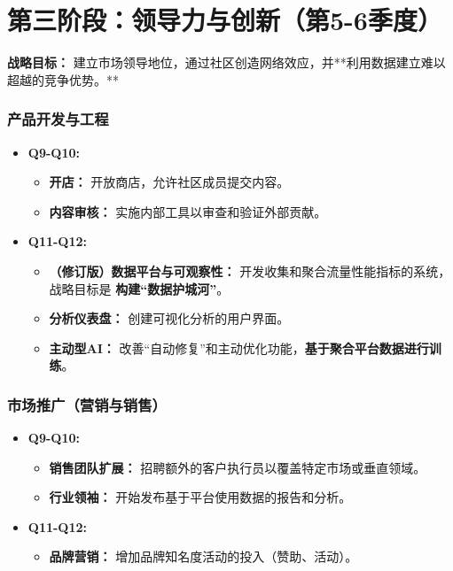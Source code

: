 \documentclass[11点, A4纸, 单面]{article}
\begin{document}
\clearpage

\section{第三阶段：领导力与创新（第5-6季度）}
\textbf{战略目标：} 建立市场领导地位，通过社区创造网络效应，并**利用数据建立难以超越的竞争优势。**

\subsubsection{产品开发与工程}
\begin{itemize}[leftmargin=*]
    \item \textbf{Q9-Q10:}
    \begin{itemize}
        \item \textbf{开店：} 开放商店，允许社区成员提交内容。
        \item \textbf{内容审核：} 实施内部工具以审查和验证外部贡献。
    \end{itemize}
    \item \textbf{Q11-Q12:}
    \begin{itemize}
        \item \textbf{（修订版）数据平台与可观察性：} 开发收集和聚合流量性能指标的系统，战略目标是 \textbf{构建“数据护城河”}。
        \item \textbf{分析仪表盘：} 创建可视化分析的用户界面。
        \item \textbf{主动型AI：} 改善“自动修复”和主动优化功能，\textbf{基于聚合平台数据进行训练}。
    \end{itemize}
\end{itemize}

\subsubsection{市场推广（营销与销售）}
\begin{itemize}[leftmargin=*]
    \item \textbf{Q9-Q10:}
    \begin{itemize}
        \item \textbf{销售团队扩展：} 招聘额外的客户执行员以覆盖特定市场或垂直领域。
        \item \textbf{行业领袖：} 开始发布基于平台使用数据的报告和分析。
    \end{itemize}
    \item \textbf{Q11-Q12:}
    \begin{itemize}
        \item \textbf{品牌营销：} 增加品牌知名度活动的投入（赞助、活动）。
    \end{itemize}
\end{itemize}
\end{document}
